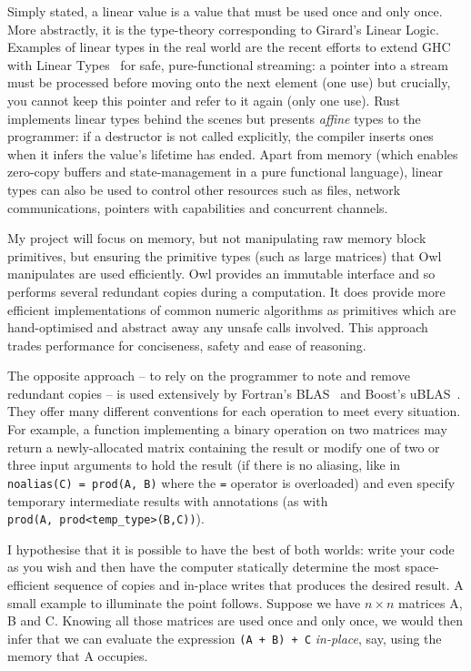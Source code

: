 \documentclass[11pt]{article}
\begin{document}
Simply stated, a linear value is a value that must be used once and only once.
More abstractly, it is the type-theory corresponding to Girard's Linear Logic.
Examples of linear types in the real world are the recent efforts to extend GHC
with Linear Types~\cite{retrofitting} for safe, pure-functional streaming: a
pointer into a stream must be processed before moving onto the next element (one
use) but crucially, you cannot keep this pointer and refer to it again (only one
use).  Rust implements linear types behind the scenes but presents \emph{affine}
types to the programmer: if a destructor is not called explicitly, the compiler
inserts ones when it infers the value's lifetime has ended. Apart from memory
(which enables zero-copy buffers and state-management in a pure functional
language), linear types can also be used to control other resources such as
files, network communications, pointers with capabilities and concurrent
channels.

My project will focus on memory, but not manipulating raw memory block
primitives, but ensuring the primitive types (such as large matrices) that
Owl~\cite{owl} manipulates are used efficiently. Owl provides an immutable
interface and so performs several redundant copies during a computation. It does
provide more efficient implementations of common numeric algorithms as
primitives which are hand-optimised and abstract away any unsafe calls involved.
This approach trades performance for conciseness, safety and ease of reasoning.

The opposite approach -- to rely on the programmer to note and remove redundant
copies -- is used extensively by Fortran's BLAS~\cite{blas} and Boost's
uBLAS~\cite{ublas}. They offer many different conventions for each operation to
meet every situation. For example, a function implementing a binary operation on
two matrices may return a newly-allocated matrix containing the result or modify
one of two or three input arguments to hold the result (if there is no aliasing,
like in \texttt{noalias(C)~=~prod(A,~B)} where the \texttt{=} operator is
overloaded) and even specify temporary intermediate results with annotations (as
with \texttt{prod(A,~prod<temp\_type>(B,C))}).

I hypothesise that it is possible to have the best of both worlds: write your
code as you wish and then have the computer statically determine the most
space-efficient sequence of copies and in-place writes that produces the
desired result. A small example to illuminate the point follows. Suppose we
have $n\times n$ matrices A, B and C. Knowing all those matrices are used
once and only once, we would then infer that we can evaluate the expression
\texttt{(A + B) + C} \emph{in-place}, say, using the memory that A
occupies.
\end{document}
